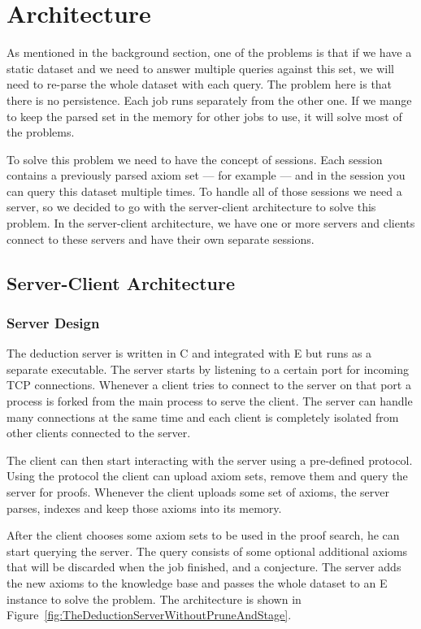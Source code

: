 \chapter{Architecture}

As mentioned in the background section, one of the problems is that if we have a static dataset and we need to answer multiple queries against this set, we will need to re-parse the whole dataset with each query. The problem here is that there is no persistence. Each job runs separately from the other one. If we mange to keep the parsed set in the memory for other jobs to use, it will solve most of the problems.

To solve this problem we need to have the concept of sessions. Each session contains a previously parsed axiom set --- for example --- and in the session you can query this dataset multiple times. To handle all of those sessions we need a server, so we decided to go with the server-client architecture to solve this problem. In the server-client architecture, we have one or more servers and clients connect to these servers and have their own separate sessions.

\section{Server-Client Architecture}
\subsection{Server Design}
The deduction server is written in C and integrated with E but runs as a separate executable. The server starts by listening to a certain port for incoming TCP connections. Whenever a client tries to connect to the server on that port a process is forked from the main process to serve the client. The server can handle many connections at the same time and each client is completely isolated from other clients connected to the server.

The client can then start interacting with the server using a pre-defined protocol. Using the protocol the client can upload axiom sets, remove them and query the server for proofs. Whenever the client uploads some set of axioms, the server parses, indexes and keep those axioms into its memory. 

After the client chooses some axiom sets to be used in the proof search, he can start querying the server. The query consists of some optional additional axioms that will be discarded when the job finished, and a conjecture. The server adds the new axioms to the knowledge base and passes the whole dataset to an E instance to solve the problem. The architecture is shown in Figure~\ref{fig:TheDeductionServerWithoutPruneAndStage}.


